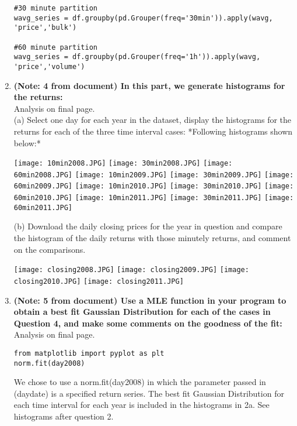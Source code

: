 \documentclass[12pt]{article}
\begin{document}
\begin{enumerate}
\begin{verbatim}
#30 minute partition
wavg_series = df.groupby(pd.Grouper(freq='30min')).apply(wavg, 'price','bulk')

#60 minute partition
wavg_series = df.groupby(pd.Grouper(freq='1h')).apply(wavg, 'price','volume')
\end{verbatim}

\item \textbf{(Note: 4 from document) In this part, we generate histograms for the returns:} 
\\Analysis on final page.
\\(a) Select one day for each year in the dataset, display the histograms for the returns for each of the three time interval cases:
*Following histograms shown below:*
\begin{center}
 \texttt{[image: 10min2008.JPG]}
 \texttt{[image: 30min2008.JPG]}
 \texttt{[image: 60min2008.JPG]}
 \texttt{[image: 10min2009.JPG]}
 \texttt{[image: 30min2009.JPG]}
 \texttt{[image: 60min2009.JPG]}
 \texttt{[image: 10min2010.JPG]}
 \texttt{[image: 30min2010.JPG]}
 \texttt{[image: 60min2010.JPG]}
 \texttt{[image: 10min2011.JPG]}
 \texttt{[image: 30min2011.JPG]}
 \texttt{[image: 60min2011.JPG]}

\end{center}

\newpage
(b) Download the daily closing prices for the year in question and compare the histogram of the daily returns with those minutely returns, and comment on the comparisons. 
\begin{center}
 \texttt{[image: closing2008.JPG]}
 \texttt{[image: closing2009.JPG]}
 \texttt{[image: closing2010.JPG]}
 \texttt{[image: closing2011.JPG]}
\end{center}

\newpage
\item \textbf{(Note: 5 from document) Use a MLE function in your program to obtain a best fit Gaussian Distribution for each of the cases in Question 4, and make some comments on the goodness of the fit:}
\\Analysis on final page.

\begin{verbatim}
from matplotlib import pyplot as plt
norm.fit(day2008)
\end{verbatim}
We chose to use a norm.fit(day2008) in which the parameter passed in (daydate) is a specified return series.
The best fit Gaussian Distribution for each time interval for each year is included in the histograms in 2a. See histograms after question 2.


\end{enumerate}
\end{document}
